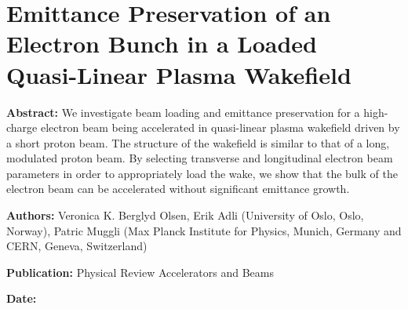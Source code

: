 %
%

\chapter[Emittance Preservation of an Electron Bunch in a Loaded Quasi-Linear Plasma\\Wakefield,
         \emph{Physical Review Accelerators and Beams}]%
        {Emittance Preservation of an Electron Bunch in a Loaded\\Quasi-Linear Plasma Wakefield}
\label{Pub:BL17}

\begin{hangparas}{10mm}{1}

    \textbf{Abstract:}
    We investigate beam loading and emittance preservation for a high-charge electron beam being accelerated in
    quasi-linear plasma wakefield driven by a short proton beam. The structure of the wakefield is similar to that of a
    long, modulated proton beam. By selecting transverse and longitudinal electron beam parameters in order to
    appropriately load the wake, we show that the bulk of the electron beam can be accelerated without significant
    emittance growth.

    \vspace{8mm}

    \textbf{Authors:}
    Veronica K. Berglyd Olsen, Erik Adli (University of Oslo, Oslo, Norway),
    Patric Muggli (Max Planck Institute for Physics, Munich, Germany and CERN, Geneva, Switzerland)

    \vspace{5mm}

    \textbf{Publication:}
    Physical Review Accelerators and Beams

    \vspace{5mm}

    \textbf{Date:}

\end{hangparas}
